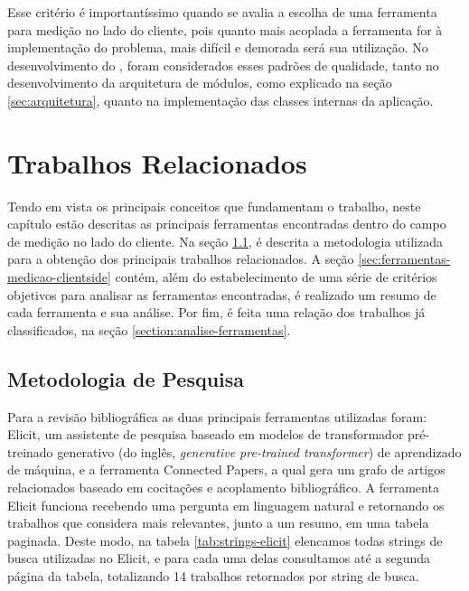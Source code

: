 \documentclass[12pt]{tcc}
\begin{document}
		Esse critério é importantíssimo quando se avalia a escolha de uma ferramenta para medição no lado do cliente, pois quanto mais acoplada a ferramenta for à implementação do problema, mais difícil e demorada será sua utilização. No desenvolvimento do , foram considerados esses padrões de qualidade, tanto no desenvolvimento da arquitetura de módulos, como explicado na seção \ref{sec:arquitetura}, quanto na implementação das classes internas da aplicação. 


\chapter{Trabalhos Relacionados}
	\label{cap:metodologiatrabsrelacionados}

	\par Tendo em vista os principais conceitos que fundamentam o trabalho, neste capítulo estão descritas as principais ferramentas encontradas dentro do campo de medição no lado do cliente. Na seção \ref{section:metodologia-de-pesquisa}, é descrita a metodologia utilizada para a obtenção dos principais trabalhos relacionados. A seção \ref{sec:ferramentas-medicao-clientside} contém, além do estabelecimento de uma série de critérios objetivos para analisar as ferramentas encontradas, é realizado um resumo de cada ferramenta e sua análise. Por fim, é feita uma relação dos trabalhos já classificados, na seção \ref{section:analise-ferramentas}.

	\section{Metodologia de Pesquisa}
	\label{section:metodologia-de-pesquisa}

	Para a revisão bibliográfica as duas principais ferramentas utilizadas foram: Elicit, um assistente de pesquisa baseado em modelos de transformador pré-treinado generativo (do inglês, \emph{generative pre-trained transformer}) de aprendizado de máquina, e a ferramenta Connected Papers, a qual  gera um grafo de artigos relacionados baseado em cocitações e acoplamento bibliográfico.
	A ferramenta Elicit funciona recebendo uma pergunta em linguagem natural e retornando os trabalhos que considera mais relevantes, junto a um resumo, em uma tabela paginada.
	Deste modo, na tabela \ref{tab:strings-elicit} elencamos todas strings de busca utilizadas no Elicit, e para cada uma delas consultamos até a segunda página da tabela, totalizando 14 trabalhos retornados por string de busca.
\end{document}
